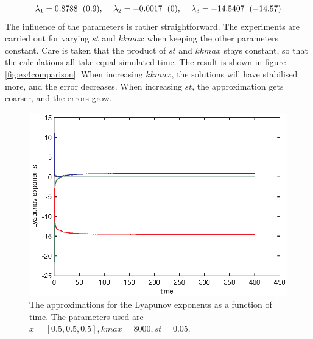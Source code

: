 \begin{equation}
\lambda_1=0.8788\mbox{\hspace{6pt}}(0.9),\mbox{\hspace{12pt}} \lambda_2= -0.0017 \mbox{\hspace{6pt}}(0),\mbox{\hspace{12pt}} \lambda_3= -14.5407 \mbox{\hspace{6pt}}(-14.57)
\end{equation}
The influence of the parameters is rather straightforward. The experiments are carried out for varying $st$ and $kkmax$ when keeping the other parameters constant. Care is taken that the product of $st$ and $kkmax$ stays constant, so that the calculations all take equal simulated time. The result is shown in figure \ref{fig:ex4comparison}. When increasing $kkmax$, the solutions will have stabilised more, and the error decreases. When increasing $st$, the approximation gets coarser, and the errors grow.
\begin{figure}[htp]
\centering
\includegraphics{img/ex4/lyaplorenz.eps}
\caption{The approximations for the Lyapunov exponents as a function of time. The parameters used are $x=[0.5,0.5,0.5],kmax=8000,st=0.05$.}
\label{fig:ex4lyapunovlorenz}
\end{figure}
